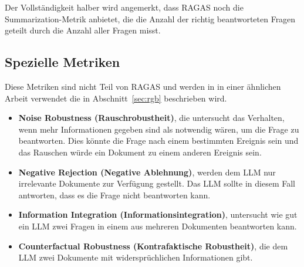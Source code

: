 Der Vollständigkeit halber wird angemerkt, dass RAGAS noch die Summarization-Metrik anbietet, die die Anzahl der richtig beantworteten Fragen geteilt durch die Anzahl aller Fragen misst.



\subsection{Spezielle Metriken}
\label{sec:rgb_metrics}

Diese Metriken sind nicht Teil von RAGAS und werden in in einer ähnlichen Arbeit verwendet die in Abschnitt~\ref{sec:rgb} beschrieben wird.

\begin{itemize}
    \item \textbf{Noise Robustness (Rauschrobustheit)}, die untersucht das Verhalten, wenn mehr Informationen gegeben sind als notwendig wären, um die Frage zu beantworten.
    Dies könnte die Frage nach einem bestimmten Ereignis sein und das Rauschen würde ein Dokument zu einem anderen Ereignis sein.

    \item \textbf{Negative Rejection (Negative Ablehnung)}, werden dem LLM nur irrelevante Dokumente zur Verfügung gestellt. Das LLM sollte in diesem Fall antworten, dass es die Frage nicht beantworten kann.

    \item \textbf{Information Integration (Informationsintegration)}, untersucht wie gut ein LLM zwei Fragen in einem aus mehreren Dokumenten beantworten kann.

    \item \textbf{Counterfactual Robustness (Kontrafaktische Robustheit)}, die dem LLM zwei Dokumente mit widersprüchlichen Informationen gibt.
\end{itemize}